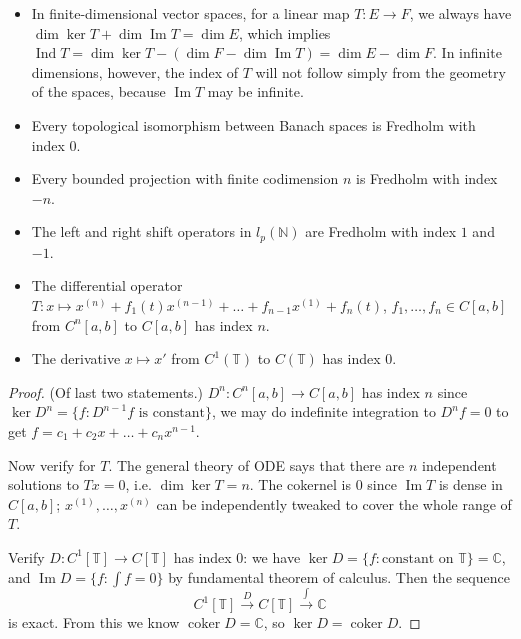 \begin{example}
	\begin{itemize}
		\item In finite-dimensional vector spaces, for a linear map $T: E \to F$, we always have $\operatorname{dim} \operatorname{ker} T + \operatorname{dim} \operatorname{Im} T  = \operatorname{dim} E$, which implies $\operatorname{Ind } T = \operatorname{dim} \operatorname{ker} T - (\operatorname{dim} F - \operatorname{dim} \operatorname{Im} T) = \operatorname{dim} E - \operatorname{dim} F$. In infinite dimensions, however, the index of $T$ will not follow simply from the geometry of the spaces, because $\operatorname{Im} T$ may be infinite.
		\item Every topological isomorphism between Banach spaces is Fredholm with index $0$.
		\item Every bounded projection with finite codimension $n$ is Fredholm with index $-n$.
		\item The left and right shift operators in $l_p(\mathbb{N})$ are Fredholm with index $1$ and $-1$.
		\item The differential operator $T: x\mapsto x^{(n)} + f_1(t) x^{(n - 1)} + \ldots + f_{n - 1} x^{(1)} + f_n(t)$, $f_1, \ldots, f_n \in C[a,b]$ from $C^n[a,b]$ to $C[a,b]$ has index $n$.
		\item The derivative $x \mapsto x'$ from $C^1(\mathbb{T})$ to $C(\mathbb{T})$ has index $0$.
	\end{itemize}
\end{example}
\begin{proof}(Of last two statements.)
	$D^n: C^n[a,b] \to C[a,b]$ has index $n$ since $\operatorname{ker} D^n = \{f: D^{n - 1} f \text{ is constant}\} $, we may do indefinite integration to $D^n f = 0$ to get $f = c_1 + c_2 x + \ldots + c_n x^{n - 1}$.

	Now verify for $T$. The general theory of ODE says that there are $n$ independent solutions to $T x = 0$, i.e. $\operatorname{dim} \operatorname{ker} T = n$. The cokernel is 0 since $\operatorname{Im} T$ is dense in $C[a,b]$; $x^{(1)}, \ldots, x^{(n)}$ can be independently tweaked to cover the whole range of $T$.

	Verify $D: C^1[\mathbb{T}] \to C[\mathbb{T}]$ has index 0: we have $\operatorname{ker} D = \{f: \text{constant on } \mathbb{T} \} = \mathbb{C} $, and $\operatorname{Im} D = \{f: \int f = 0\} $ by fundamental theorem of calculus. Then the sequence
	\[
		C^1[\mathbb{T}] \xrightarrow{D} C[\mathbb{T}] \xrightarrow{\int } \mathbb{C} 
	\] 
	is exact. From this we know $\operatorname{coker} D = \mathbb{C}$, so $\operatorname{ker} D = \operatorname{coker} D$.
\end{proof}


